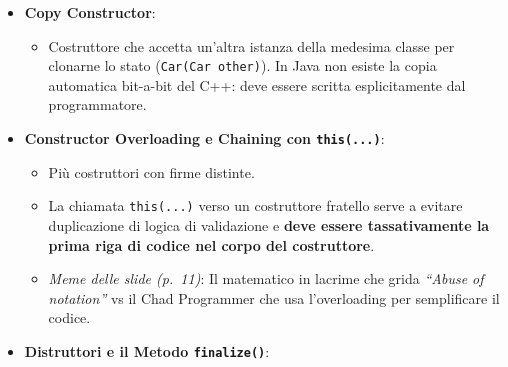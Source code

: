 \documentclass[11pt,a4paper]{article}
\newcommand{\passthrough}[1]{#1}
\providecommand{\tightlist}{\setlength{\itemsep}{0pt}\setlength{\parskip}{0pt}}
\begin{document}
\begin{itemize}
  \begin{itemize}
  \item
    Se si inserisce un tipo di ritorno (ad esempio
    \passthrough{\lstinline!void Car(String color)!}):

\begin{lstlisting}[language=Java]
public class Car {
    void Car(String color) { ... } // Attenzione:  NON È UN COSTRUTTORE!
}
\end{lstlisting}
  \item
    Per il compilatore questo è un \textbf{normale metodo d'istanza}
    (avente incidentalmente lo stesso nome della classe). Il compilatore
    aggiungerà comunque il costruttore di default
    \passthrough{\lstinline!Car()!}, e il metodo
    \passthrough{\lstinline!void Car(...)!} non verrà mai invocato al
    momento del \passthrough{\lstinline!new!}!
  \end{itemize}
\item
  \textbf{Copy Constructor}:

  \begin{itemize}
  \tightlist
  \item
    Costruttore che accetta un'altra istanza della medesima classe per
    clonarne lo stato (\passthrough{\lstinline!Car(Car other)!}). In
    Java non esiste la copia automatica bit-a-bit del C++: deve essere
    scritta esplicitamente dal programmatore.
  \end{itemize}
\item
  \textbf{Constructor Overloading e Chaining con
  \passthrough{\lstinline!this(...)!}}:

  \begin{itemize}
  \tightlist
  \item
    Più costruttori con firme distinte.
  \item
    La chiamata \passthrough{\lstinline!this(...)!} verso un costruttore
    fratello serve a evitare duplicazione di logica di validazione e
    \textbf{deve essere tassativamente la prima riga di codice nel corpo
    del costruttore}.
  \item
    \emph{Meme delle slide (p.~11)}: Il matematico in lacrime che grida
    \emph{``Abuse of notation''} vs il Chad Programmer che usa
    l'overloading per semplificare il codice.
  \end{itemize}
\item
  \textbf{Distruttori e il Metodo \passthrough{\lstinline!finalize()!}}:


\end{itemize}
\end{document}

